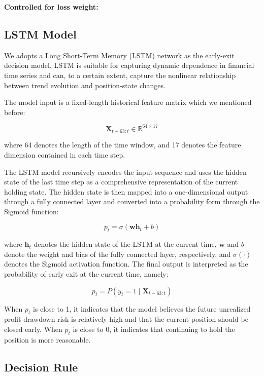 \documentclass[12pt]{article}
\begin{document}
\textbf{Controlled for loss weight:}

\subsection{LSTM Model}

We adopts a Long Short-Term Memory (LSTM) network as the early-exit decision model. 
LSTM is suitable for capturing dynamic dependence in financial time series and can, to a 
certain extent, capture the nonlinear relationship between trend evolution and position-state 
changes.

The model input is a fixed-length historical feature matrix which we mentioned before:

\begin{equation}
    \mathbf{X}_{t-63:t} \in \mathbb{R}^{64 \times 17}
\end{equation}

where 64 denotes the length of the time window, and 17 denotes the feature dimension contained 
in each time step.

The LSTM model recursively encodes the input sequence and uses the hidden state of the last 
time step as a comprehensive representation of the current holding state. The hidden state is 
then mapped into a one-dimensional output through a fully connected layer and converted into a 
probability form through the Sigmoid function:

\begin{equation}
    p_t = \sigma(\mathbf{w}\mathbf{h}_t + b)
\end{equation}

where $\mathbf{h}_t$ denotes the hidden state of the LSTM at the current time, $\mathbf{w}$ and 
$b$ denote the weight and bias of the fully connected layer, respectively, and $\sigma(\cdot)$ 
denotes the Sigmoid activation function. The final output is interpreted as the probability of 
early exit at the current time, namely:

\begin{equation}
    p_t = P(y_t = 1 \mid \mathbf{X}_{t-63:t})
\end{equation}

When $p_t$ is close to 1, it indicates that the model believes the future unrealized profit 
drawdown risk is relatively high and that the current position should be closed early. When 
$p_t$ is close to 0, it indicates that continuing to hold the position is more reasonable.

\subsection{Decision Rule}
\end{document}
